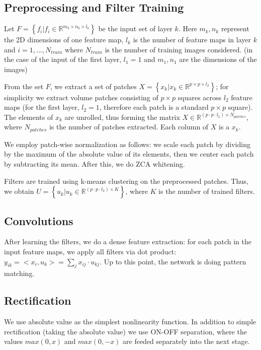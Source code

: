\documentclass[runningheads]{llncs}
\begin{document}
\subsection{Preprocessing and Filter Training}
Let $F=\left \{ f_i|f_i\in \mathbb{R}^{m_k\times n_k\times l_k} \right \}$ be the input set of layer $k$.
Here $m_k, n_k$ represent the 2D dimensions of one feature map, $l_k$ is the number of feature maps in layer $k$ and $i=1, ..., N_{train}$ where $N_{train}$ is the number of training images considered. (in the case of the input of the first layer, $l_1=1$ and $m_1, n_1$ are the dimensions of the images)

From the set $F$, we extract a set of patches $X=\left \{ x_k|x_k\in \mathbb{R}^{p\times p\times l_2} \right \}$; for simplicity we extract volume patches consisting of $p\times p$ squares across $l_2$ feature maps (for the first layer, $l_2=1$, therefore each patch is a standard $p \times p$ square).
The elements of $x_k$ are unrolled, thus forming the matrix $X\in \mathbb{R}^{(p \cdot p \cdot l_2)\times N_{patches}}$, where $N_{patches}$ is the number of patches extracted. Each column of $X$ is a $x_k$.

We employ patch-wise normalization as follows: we scale each patch by dividing by the maximum of the absolute value of its elements, then we center each patch by subtracting its mean.
After this, we do ZCA whitening. 

Filters are trained using k-means clustering on the preprocessed patches. Thus, we obtain $U=\left \{ u_k|u_k\in \mathbb{R}^{(p\cdot p\cdot l_2)\times K} \right \}$, where $K$ is the number of trained filters.

\subsection{Convolutions}
After learning the filters, we do a dense feature extraction: for each patch in the input feature maps, we apply all filters via dot product: $y_{ik}=<x_i,u_k>=\sum_jx_{ij}\cdot u_{kj}$. Up to this point, the network is doing pattern matching.

\subsection{Rectification}
We use absolute value as the simplest nonlinearity function. In addition to simple rectification (taking the absolute value) we use ON-OFF separation, where the values $max(0,x)$ and $max(0,-x)$ are feeded separately into the next stage.
\end{document}
